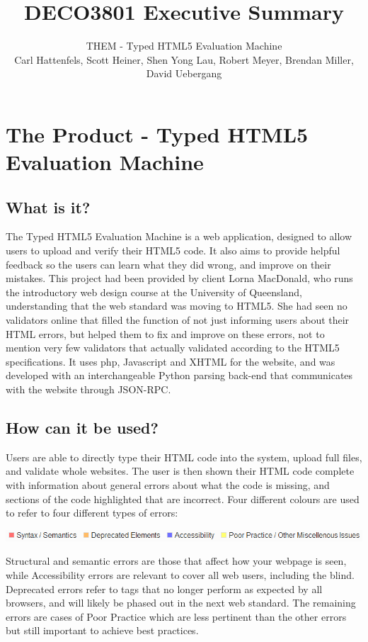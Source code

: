 \documentclass[10pt]{article}
\title{\bf DECO3801 Executive Summary}
\author{\normalsize THEM - Typed HTML5 Evaluation Machine \\ \normalsize Carl Hattenfels, Scott Heiner, Shen Yong Lau, Robert Meyer, Brendan Miller, David Uebergang}
\date{}
\begin{document}
\maketitle

\section*{The Product - Typed HTML5 Evaluation Machine}

\subsection*{What is it?}

The Typed HTML5 Evaluation Machine is a web application, designed to allow users to upload and verify their HTML5 code. It also aims to provide helpful feedback so the users can learn what they did wrong, and improve on their mistakes. This project had been provided by client Lorna MacDonald, who runs the introductory web design course at the University of Queensland, understanding that the web standard was moving to HTML5. She had seen no validators online that filled the function of not just informing users about their HTML errors, but helped them to fix and improve on these errors, not to mention very few validators that actually validated according to the HTML5 specifications. It uses php, Javascript and XHTML for the website, and was developed with an interchangeable Python parsing back-end that communicates with the website through JSON-RPC.

\subsection*{How can it be used?}

Users are able to directly type their HTML code into the system, upload full files, and validate whole websites. The user is then shown their HTML code complete with information about general errors about what the code is missing, and sections of the code highlighted that are incorrect. Four different colours are used to refer to four different types of errors:

\begin{center}
\includegraphics[scale=0.5]{errortypes.png}
\end{center}

Structural and semantic errors are those that affect how your webpage is seen, while Accessibility errors are relevant to cover all web users, including the blind. Deprecated errors refer to tags that no longer perform as expected by all browsers, and will likely be phased out in the next web standard. The remaining errors are cases of Poor Practice which are less pertinent than the other errors but still important to achieve best practices.
\end{document}
